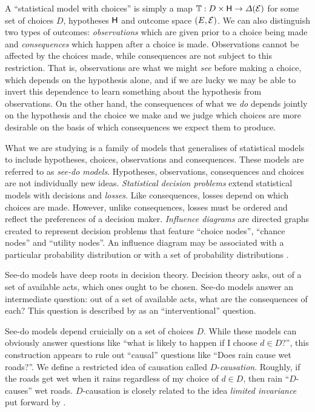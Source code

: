 A ``statistical model with choices'' is simply a map $\mathbb{T}:D\times \mathsf{H}\to \Delta(\mathcal{E})$ for some set of choices $D$, hypotheses $\mathsf{H}$ and outcome space $(E,\mathcal{E})$. We can also distinguish two types of outcomes: \emph{observations} which are given prior to a choice being made and \emph{consequences} which happen after a choice is made. Observations cannot be affected by the choices made, while consequences are not subject to this restriction. That is, observations are what we might \emph{see} before making a choice, which depends on the hypothesis alone, and if we are lucky we may be able to invert this dependence to learn something about the hypothesis from observations. On the other hand, the consequences of what we \emph{do} depends jointly on the hypothesis and the choice we make and we judge which choices are more desirable on the basis of which consequences we expect them to produce. 

What we are studying is a family of models that generalises of statistical models to include hypotheses, choices, observations and consequences. These models are referred to as \emph{see-do models}. Hypotheses, observations, consequences and choices are not individually new ideas. \emph{Statistical decision problems} \citep{wald_statistical_1950,savage_foundations_1972} extend statistical models with decisions and \emph{losses}. Like consequences, losses depend on which choices are made. However, unlike consequences, losses must be ordered and reflect the preferences of a decision maker. \emph{Influence diagrams} are directed graphs created to represent decision problems that feature ``choice nodes'', ``chance nodes'' and ``utility nodes''. An influence diagram may be associated with a particular probability distribution \cite{nilsson_evaluating_2013} or with a set of probability distributions \cite{dawid_influence_2002}.

See-do models have deep roots in decision theory. Decision theory asks, out of a set of available acts, which ones ought to be chosen. See-do models answer an intermediate question: out of a set of available acts, what are the consequences of each? This question is described by \citet{pearl_causality:_2009} as an ``interventional'' question.

See-do models depend cruicially on a set of choices $D$. While these models can obviously answer questions like ``what is likely to happen if I choose $d\in D$?'', this construction appears to rule out ``causal'' questions like ``Does rain cause wet roads?''. We define a restricted idea of causation called $D$-\emph{causation}. Roughly, if the roads get wet when it rains regardless of my choice of $d\in D$, then rain ``$D$-causes'' wet roads. $D$-causation is closely related to the idea \emph{limited invariance} put forward by \citet{heckerman_decision-theoretic_1995}.


